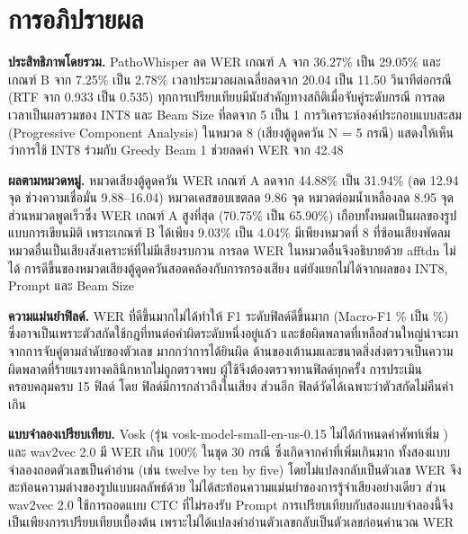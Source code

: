 

\section{การอภิปรายผล}

\textbf{ประสิทธิภาพโดยรวม.} PathoWhisper ลด WER เกณฑ์ A จาก 36.27\% เป็น 29.05\% และเกณฑ์ B จาก 7.25\% เป็น 2.78\% เวลาประมวลผลเฉลี่ยลดจาก 20.04 เป็น 11.50 วินาทีต่อกรณี (RTF จาก 0.933 เป็น 0.535) ทุกการเปรียบเทียบมีนัยสำคัญทางสถิติเมื่อจับคู่ระดับกรณี การลดเวลาเป็นผลรวมของ INT8 และ Beam Size ที่ลดจาก 5 เป็น 1 การวิเคราะห์องค์ประกอบแบบสะสม (Progressive Component Analysis) ในหมวด 8 (เสียงตู้ดูดควัน N = 5 กรณี) แสดงให้เห็นว่าการใช้ INT8 ร่วมกับ Greedy Beam 1 ช่วยลดค่า WER จาก 42.48%

\textbf{ผลตามหมวดหมู่.} หมวดเสียงตู้ดูดควัน WER เกณฑ์ A ลดจาก 44.88\% เป็น 31.94\% (ลด 12.94 จุด ช่วงความเชื่อมั่น 9.88--16.04) หมวดเคสขอบเขตลด 9.86 จุด หมวดต่อมน้ำเหลืองลด 8.95 จุด ส่วนหมวดพูดเร็วซึ่ง WER เกณฑ์ A สูงที่สุด (70.75\% เป็น 65.90\%) เกือบทั้งหมดเป็นผลของรูปแบบการเขียนมิติ เพราะเกณฑ์ B ได้เพียง 9.03\% เป็น 4.04\% มีเพียงหมวดที่ 8 ที่ซ้อนเสียงพัดลม หมวดอื่นเป็นเสียงสังเคราะห์ที่ไม่มีเสียงรบกวน การลด WER ในหมวดอื่นจึงอธิบายด้วย afftdn ไม่ได้ การดีขึ้นของหมวดเสียงตู้ดูดควันสอดคล้องกับการกรองเสียง แต่ยังแยกไม่ได้จากผลของ INT8, Prompt และ Beam Size

\textbf{ความแม่นยำฟิลด์.} WER ที่ดีขึ้นมากไม่ได้ทำให้ F1 ระดับฟิลด์ดีขึ้นมาก (Macro-F1 \MacroBase\% เป็น \MacroPW\%) ซึ่งอาจเป็นเพราะตัวสกัดใช้กฎที่ทนต่อคำผิดระดับหนึ่งอยู่แล้ว และข้อผิดพลาดที่เหลือส่วนใหญ่น่าจะมาจากการจับคู่ตามลำดับของตัวเลข มากกว่าการได้ยินผิด ด้านของเต้านมและขนาดสิ่งส่งตรวจเป็นความผิดพลาดที่ร้ายแรงทางคลินิกหากไม่ถูกตรวจพบ ผู้ใช้จึงต้องตรวจทานฟิลด์ทุกครั้ง การประเมินครอบคลุมครบ 15 ฟิลด์ โดย \nSpoken{} ฟิลด์มีการกล่าวถึงในเสียง ส่วนอีก \nNeg{} ฟิลด์วัดได้เฉพาะว่าตัวสกัดไม่คืนค่าเกิน

\textbf{แบบจำลองเปรียบเทียบ.} Vosk (รุ่น vosk-model-small-en-us-0.15 ไม่ได้กำหนดคำศัพท์เพิ่ม \cite{vosk}) และ wav2vec 2.0 มี WER เกิน 100\% ในชุด 30 กรณี ซึ่งเกิดจากคำที่เพิ่มเกินมาก ทั้งสองแบบจำลองถอดตัวเลขเป็นคำอ่าน (เช่น twelve by ten by five) โดยไม่แปลงกลับเป็นตัวเลข WER จึงสะท้อนความต่างของรูปแบบผลลัพธ์ด้วย ไม่ได้สะท้อนความแม่นยำของการรู้จำเสียงอย่างเดียว ส่วน wav2vec 2.0 ใช้การถอดแบบ CTC ที่ไม่รองรับ Prompt การเปรียบเทียบกับสองแบบจำลองนี้จึงเป็นเพียงการเปรียบเทียบเบื้องต้น เพราะไม่ได้แปลงคำอ่านตัวเลขกลับเป็นตัวเลขก่อนคำนวณ WER

